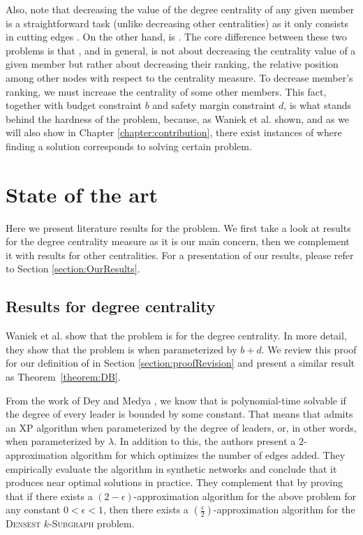Also, note that decreasing the value of the degree centrality of any given member is a straightforward task
(unlike decreasing other centralities) as it only consists in cutting edges \cite{Waniek2016}.
On the other hand, \HLdeg is \NPc \cite{Waniek2017}.
The core difference between these two problems is that \HLdeg, and \HLshort in general,
is not about decreasing the centrality value of a given member but rather about decreasing their ranking,
the relative position among other nodes with respect to the centrality measure.
To decrease member's ranking, we must increase the centrality of some other members.
This fact, together with budget constraint $b$ and safety margin constraint $d$,
is what stands behind the hardness of the \HL problem, because,
as Waniek et al. \cite{Waniek2017} shown, and as we will also show in Chapter \ref{chapter:contribution},
there exist instances of \HLshort where finding a solution corresponds to solving certain \NPh problem.


\section{State of the art}

Here we present literature results for the \HL problem.
We first take a look at results for the degree centrality measure as it is our main concern, then we
complement it with results for other centralities.
For a presentation of our results, please refer to Section \ref{section:OurResults}.


\subsection{Results for degree centrality}\label{subsection:ResultsDegree}

Waniek et al. \cite{Waniek2017} show that the \HL problem is \NPc for the degree centrality.
In more detail, they show that the problem is \Wh when parameterized by $b+d$.
We review this proof for our definition of \HLshort in Section \ref{section:proofRevision} and present
a similar result as Theorem~\ref{theorem:DB}.

From the work of Dey and Medya \cite{Dey2019}, we know that \HLdeg is polynomial-time solvable
if the degree of every leader is bounded by some constant.
That means that \HLdeg admits an XP algorithm when parameterized by the degree of leaders, or,
in other words, when parameterized by $\lambda$.
In addition to this, the authors present a $2$-approximation algorithm for \HLdeg which optimizes
the number of edges added.
They empirically evaluate the algorithm in synthetic networks and conclude that it produces near
optimal solutions in practice.
They complement that by proving that if there exists a $(2-\epsilon)$-approximation algorithm
for the above problem for any constant $0 < \epsilon < 1$, then there exists
a $(\frac{\epsilon}{2})$-approximation algorithm for the \textsc{Densest} $k$-\textsc{Subgraph} problem.


